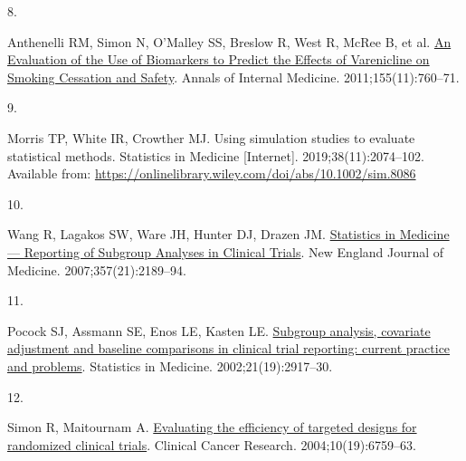 \documentclass[
  letterpaper,
  DIV=11,
  numbers=noendperiod]{scrartcl}
\newlength{\cslhangindent}
\newlength{\csllabelwidth}
\newenvironment{CSLReferences}[2] %
 {\begin{list}{}{%
  \setlength{\itemindent}{0pt}
  \setlength{\leftmargin}{0pt}
  \setlength{\parsep}{0pt}
  \ifodd #1
   \setlength{\leftmargin}{\cslhangindent}
   \setlength{\itemindent}{-1\cslhangindent}
  \fi
  \setlength{\itemsep}{#2\baselineskip}}}
 {\end{list}}
\newcommand{\CSLLeftMargin}[1]{\parbox[t]{\csllabelwidth}{\strut#1\strut}}
\newcommand{\CSLRightInline}[1]{\parbox[t]{\linewidth - \csllabelwidth}{\strut#1\strut}}
\begin{document}
\begin{CSLReferences}{0}{1}
\CSLLeftMargin{8. }%
\CSLRightInline{Anthenelli RM, Simon N, O'Malley SS, Breslow R, West R,
McRee B, et al.
\href{https://doi.org/10.7326/0003-4819-155-11-201112060-00007}{{An
Evaluation of the Use of Biomarkers to Predict the Effects of
Varenicline on Smoking Cessation and Safety}}. Annals of Internal
Medicine. 2011;155(11):760--71. }

\CSLLeftMargin{9. }%
\CSLRightInline{Morris TP, White IR, Crowther MJ. {Using simulation
studies to evaluate statistical methods}. Statistics in Medicine
{[}Internet{]}. 2019;38(11):2074--102. Available from:
\url{https://onlinelibrary.wiley.com/doi/abs/10.1002/sim.8086}}

\CSLLeftMargin{10. }%
\CSLRightInline{Wang R, Lagakos SW, Ware JH, Hunter DJ, Drazen JM.
\href{https://doi.org/10.1056/NEJMsr077003}{{Statistics in Medicine ---
Reporting of Subgroup Analyses in Clinical Trials}}. New England Journal
of Medicine. 2007;357(21):2189--94. }

\CSLLeftMargin{11. }%
\CSLRightInline{Pocock SJ, Assmann SE, Enos LE, Kasten LE.
\href{https://doi.org/10.1002/sim.1296}{{Subgroup analysis, covariate
adjustment and baseline comparisons in clinical trial reporting: current
practice and problems}}. Statistics in Medicine. 2002;21(19):2917--30. }

\CSLLeftMargin{12. }%
\CSLRightInline{Simon R, Maitournam A.
\href{https://doi.org/10.1158/1078-0432.CCR-04-0721}{{Evaluating the
efficiency of targeted designs for randomized clinical trials}}.
Clinical Cancer Research. 2004;10(19):6759--63. }

\end{CSLReferences}
\end{document}
